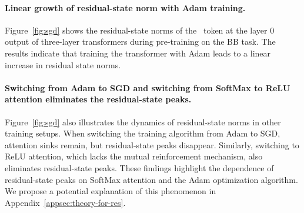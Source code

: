 


\paragraph{Linear growth of residual-state norm with Adam training.} Figure~\ref{fig:sgd} shows the residual-state norms of the \bos~token at the layer 0 output of three-layer transformers during pre-training on the BB task. The results indicate that training the transformer with Adam leads to a linear increase in residual state norms.

\paragraph{Switching from Adam to SGD and switching from SoftMax to ReLU attention eliminates the residual-state peaks.} Figure~\ref{fig:sgd} also illustrates the dynamics of residual-state norms in other training setups. When switching the training algorithm from Adam to SGD, attention sinks remain, but residual-state peaks disappear. Similarly, switching to ReLU attention, which lacks the mutual reinforcement mechanism, also eliminates residual-state peaks. These findings highlight the dependence of residual-state peaks on SoftMax attention and the Adam optimization algorithm. We propose a potential explanation of this phenomenon in Appendix~\ref{appsec:theory-for-res}. 



